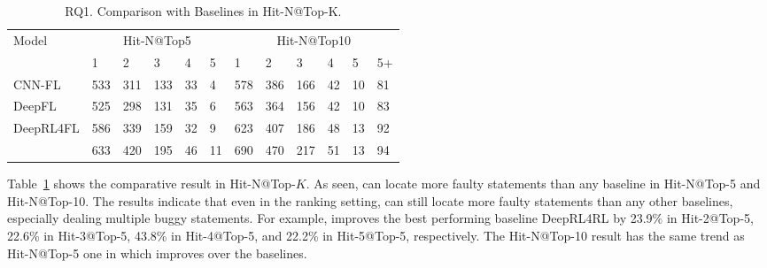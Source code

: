 \begin{table}[t]
	\caption{RQ1. Comparison with Baselines in Hit-N@Top-K.}
	{\small
		\begin{center}
			\renewcommand{\arraystretch}{1}
			\begin{tabular}{p{1.5cm}<{\centering}|p{0.3cm}<{\centering}|p{0.3cm}<{\centering}|p{0.3cm}<{\centering}|p{0.2cm}<{\centering}|p{0.2cm}<{\centering}|p{0.3cm}<{\centering}|p{0.3cm}<{\centering}|p{0.3cm}<{\centering}|p{0.2cm}<{\centering}|p{0.2cm}<{\centering}|p{0.2cm}<{\centering}}
				\hline
				\multirow{2}{*}{Model}    & \multicolumn{5}{c|}{Hit-N@Top5}& \multicolumn{6}{c}{Hit-N@Top10}\\
				\cline{2-12}
											 &1&2&3&4&5&1&2&3&4&5&5+\\
				
				\hline
				CNN-FL      & 533 & 311 & 133 & 33 & 4 & 578 & 386 & 166 & 42 & 10 & 81 \\
				DeepFL		& 525 & 298 & 131 & 35 & 6 & 563 & 364 & 156 & 42 & 10 & 83 \\
				DeepRL4FL	& 586 & 339 & 159 & 32 & 9 & 623 & 407 & 186 & 48 & 13 & 92 \\
				\hline
				\tool       & 633 & 420 & 195 & 46 & 11& 690 & 470 & 217 & 51 & 13 & 94 \\
				\hline
			\end{tabular}
			
			\label{fig:rq1-2}
		\end{center}
	}
\end{table}

Table~\ref{fig:rq1-2} shows the comparative result in Hit-N@Top-$K$.
As seen, {\tool} can locate more faulty statements than any baseline
in Hit-N@Top-5 and Hit-N@Top-10. The results indicate that even in the
ranking setting, {\tool} can still locate more faulty statements than
any other baselines, especially dealing multiple buggy statements. For
example, {\tool} improves the best performing baseline DeepRL4RL by
23.9\% in Hit-2@Top-5, 22.6\% in Hit-3@Top-5, 43.8\% in Hit-4@Top-5,
and 22.2\% in Hit-5@Top-5, respectively. The Hit-N@Top-10 result
has the same trend as Hit-N@Top-5 one in which {\tool}
improves over the baselines.
